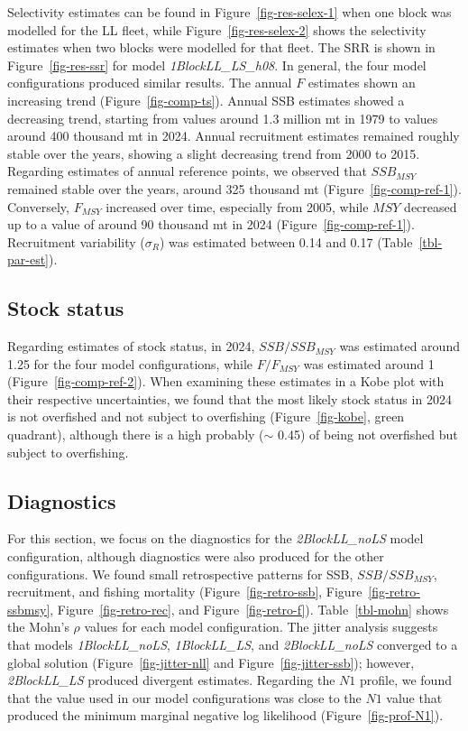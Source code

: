 \documentclass[
]{scrartcl}
\begin{document}
Selectivity estimates can be found in Figure~\ref{fig-res-selex-1} when
one block was modelled for the LL fleet, while
Figure~\ref{fig-res-selex-2} shows the selectivity estimates when two
blocks were modelled for that fleet. The SRR is shown in
Figure~\ref{fig-res-ssr} for model \emph{1BlockLL\_LS\_h08}. In general,
the four model configurations produced similar results. The annual \(F\)
estimates shown an increasing trend (Figure~\ref{fig-comp-ts}). Annual
SSB estimates showed a decreasing trend, starting from values around 1.3
million mt in 1979 to values around 400 thousand mt in 2024. Annual
recruitment estimates remained roughly stable over the years, showing a
slight decreasing trend from 2000 to 2015. Regarding estimates of annual
reference points, we observed that \(SSB_{MSY}\) remained stable over
the years, around 325 thousand mt (Figure~\ref{fig-comp-ref-1}).
Conversely, \(F_{MSY}\) increased over time, especially from 2005, while
\(MSY\) decreased up to a value of around 90 thousand mt in 2024
(Figure~\ref{fig-comp-ref-1}). Recruitment variability (\(\sigma_R\))
was estimated between 0.14 and 0.17 (Table~\ref{tbl-par-est}).

\subsection{Stock status}\label{stock-status-1}

Regarding estimates of stock status, in 2024, \(SSB/SSB_{MSY}\) was
estimated around 1.25 for the four model configurations, while
\(F/F_{MSY}\) was estimated around 1 (Figure~\ref{fig-comp-ref-2}). When
examining these estimates in a Kobe plot with their respective
uncertainties, we found that the most likely stock status in 2024 is not
overfished and not subject to overfishing (Figure~\ref{fig-kobe}, green
quadrant), although there is a high probably (\(\sim\) 0.45) of being
not overfished but subject to overfishing.

\subsection{Diagnostics}\label{diagnostics-1}

For this section, we focus on the diagnostics for the
\emph{2BlockLL\_noLS} model configuration, although diagnostics were
also produced for the other configurations. We found small retrospective
patterns for SSB, \(SSB/SSB_{MSY}\), recruitment, and fishing mortality
(Figure~\ref{fig-retro-ssb}, Figure~\ref{fig-retro-ssbmsy},
Figure~\ref{fig-retro-rec}, and Figure~\ref{fig-retro-f}).
Table~\ref{tbl-mohn} shows the Mohn's \(\rho\) values for each model
configuration. The jitter analysis suggests that models
\emph{1BlockLL\_noLS}, \emph{1BlockLL\_LS}, and \emph{2BlockLL\_noLS}
converged to a global solution (Figure~\ref{fig-jitter-nll} and
Figure~\ref{fig-jitter-ssb}); however, \emph{2BlockLL\_LS} produced
divergent estimates. Regarding the \(N1\) profile, we found that the
value used in our model configurations was close to the \(N1\) value
that produced the minimum marginal negative log likelihood
(Figure~\ref{fig-prof-N1}).
\end{document}
